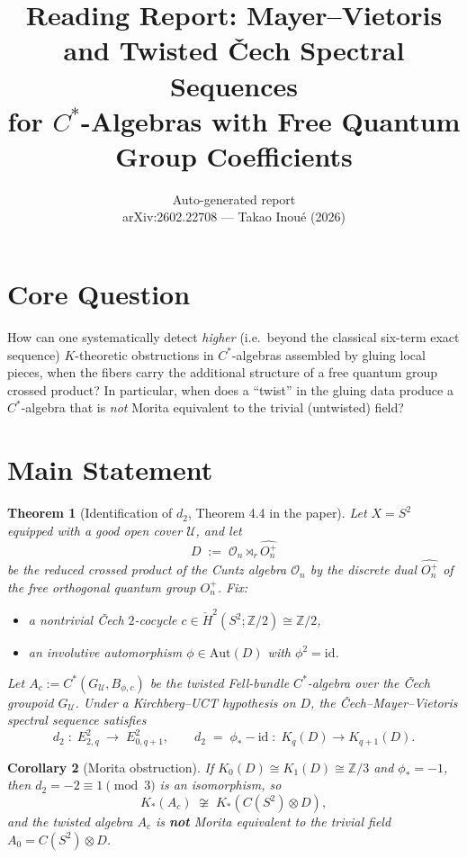 \documentclass[11pt,a4paper]{article}
\title{Reading Report: Mayer--Vietoris and Twisted \v{C}ech Spectral Sequences\\
for $C^*$-Algebras with Free Quantum Group Coefficients}
\author{Auto-generated report \\ \small arXiv:2602.22708 --- Takao Inou\'e (2026)}
\date{}
\theoremstyle{plain}
\newtheorem{theorem}{Theorem}
\newtheorem{corollary}[theorem]{Corollary}
\theoremstyle{definition}
\theoremstyle{remark}
\begin{document}
\maketitle

\section{Core Question}
How can one systematically detect \emph{higher} (i.e.\ beyond the classical six-term exact sequence) $K$-theoretic obstructions in $C^*$-algebras assembled by gluing local pieces, when the fibers carry the additional structure of a free quantum group crossed product?
In particular, when does a ``twist'' in the gluing data produce a $C^*$-algebra that is \emph{not} Morita equivalent to the trivial (untwisted) field?

\section{Main Statement}
\begin{theorem}[Identification of $d_2$, Theorem 4.4 in the paper]
Let $X = S^2$ equipped with a good open cover $\mathcal{U}$, and let
\[
D \;:=\; \mathcal{O}_n \rtimes_r \widehat{O_n^+}
\]
be the reduced crossed product of the Cuntz algebra $\mathcal{O}_n$ by the discrete dual $\widehat{O_n^+}$ of the free orthogonal quantum group $O_n^+$.
Fix:
\begin{itemize}[nosep]
  \item a nontrivial \v{C}ech $2$-cocycle $c \in \check{H}^2(S^2;\mathbb{Z}/2) \cong \mathbb{Z}/2$,
  \item an involutive automorphism $\phi \in \mathrm{Aut}(D)$ with $\phi^2 = \mathrm{id}$.
\end{itemize}
Let $A_c := C^*(G_{\mathcal{U}}, B_{\phi,c})$ be the twisted Fell-bundle $C^*$-algebra over the \v{C}ech groupoid $G_{\mathcal{U}}$.
Under a Kirchberg--UCT hypothesis on $D$, the \v{C}ech--Mayer--Vietoris spectral sequence satisfies
\[
  d_2 \;:\; E^2_{2,q} \;\longrightarrow\; E^2_{0,q+1}, \qquad
  d_2 \;=\; \phi_* - \mathrm{id} \;:\; K_q(D) \to K_{q+1}(D).
\]
\end{theorem}

\begin{corollary}[Morita obstruction]
If $K_0(D) \cong K_1(D) \cong \mathbb{Z}/3$ and $\phi_* = -1$, then $d_2 = -2 \equiv 1 \pmod{3}$ is an isomorphism, so
\[
  K_*(A_c) \;\not\cong\; K_*(C(S^2) \otimes D),
\]
and the twisted algebra $A_c$ is \textbf{not} Morita equivalent to the trivial field $A_0 = C(S^2) \otimes D$.
\end{corollary}
\end{document}
